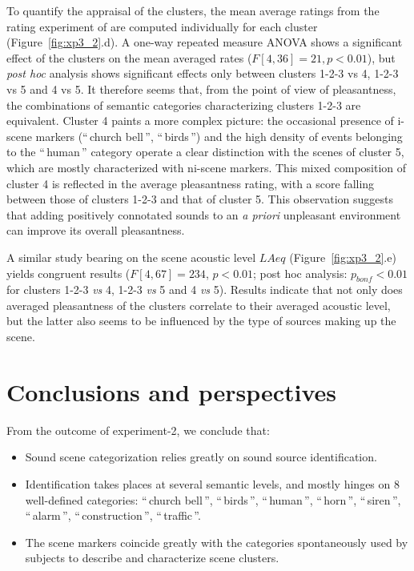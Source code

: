 \documentclass[twoside,twocolumn]{article}
\begin{document}
To quantify the appraisal of the clusters, the mean average ratings from the rating experiment of \cite{lafayPartI} are computed individually for each cluster (Figure~\ref{fig:xp3_2}.d). A one-way repeated measure ANOVA shows a significant effect of the clusters on the mean averaged rates ($F[4,36]=21, p<0.01$), but \emph{post hoc} analysis shows significant effects only between clusters 1-2-3 vs 4, 1-2-3 vs 5 and 4 vs 5. It therefore seems that, from the point of view of pleasantness, the combinations of semantic categories characterizing clusters 1-2-3 are equivalent. Cluster 4 paints a more complex picture: the occasional presence of i-scene markers (``\,church bell\,'', ``\,birds\,'') and the high density of events belonging to the ``\,human\,'' category operate a clear distinction with the scenes of cluster 5, which are mostly characterized with ni-scene markers. This mixed composition of cluster 4 is reflected in the average pleasantness rating, with a score falling between those of clusters 1-2-3 and that of cluster 5. This observation suggests that adding positively connotated sounds to an \emph{a priori} unpleasant environment can improve its overall pleasantness.

A similar study bearing on the scene acoustic level $LAeq$ (Figure~\ref{fig:xp3_2}.e) yields congruent results ($F[4,67]=234$, $p<0.01$; post hoc analysis: $p_{bonf}<0.01$ for clusters 1-2-3 \emph{vs} 4, 1-2-3 \emph{vs} 5 and 4 \emph{vs} 5). Results indicate that not only does averaged pleasantness of the clusters correlate to their averaged acoustic level, but the latter also seems to be influenced by the type of sources making up the scene.


\section{Conclusions and perspectives}

From the outcome of experiment-2, we conclude that:

\begin{itemize}
\item Sound scene categorization relies greatly on sound source identification.
\item Identification takes places at several semantic levels, and mostly hinges on 8 well-defined categories: ``\,church bell\,'', ``\,birds\,'', ``\,human\,'', ``\,horn\,'', ``\,siren\,'', ``\,alarm\,'', ``\,construction\,'', ``\,traffic\,''.
\item The scene markers coincide greatly with the categories spontaneously used by subjects to describe and characterize scene clusters.
\end{itemize}
\end{document}
